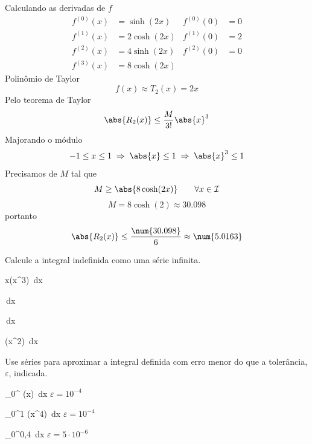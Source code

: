 \begin{exercises}
\begin{exercise}
\begin{answer}
\begin{alphalist}
			\item Calculando as derivadas de $f$
			\begin{align*}
				f^{(0)}(x) & =  \sinh(2x) & f^{(0)}(0) & = 0 \\
				f^{(1)}(x) & = 2\cosh(2x) & f^{(1)}(0) & = 2 \\
				f^{(2)}(x) & = 4\sinh(2x) & f^{(2)}(0) & = 0 \\
				f^{(3)}(x) & = 8\cosh(2x) &
			\end{align*}
			Polinômio de Taylor
			\[ f(x) \approx T_2(x) = 2x \]
			Pelo teorema de Taylor
			\[ \abs{R_2(x)} \leq \frac{M}{3!}\abs{x}^3 \]
			Majorando o módulo
			\[ -1 \leq x \leq 1
			\;\Rightarrow\; \abs{x}   \leq 1
			\;\Rightarrow\; \abs{x}^3 \leq 1
			\]
			Precisamos de $M$ tal que
			\[ M \geq \abs{8\cosh(2x)} \qquad \forall x\in \mathcal{I} \]
			\[ M = 8\cosh(2) \approx 30.098 \]
			portanto
			\[ \abs{R_2(x)} \leq \frac{\num{30.098}}{6} \approx \num{5.0163} \]
		\end{alphalist}
	\end{answer}
\end{exercise}

\begin{exercise}
	Calcule a integral indefinida como uma série infinita.
	\begin{mathlist}
		\item \int x\cos\left(x^3\right) \,dx
		\item \int {}\,dx
		\item \int {}\,dx
		\item \int \arctan(x^2) \,dx
	\end{mathlist}
\end{exercise}

\begin{exercise}
	Use séries para aproximar a integral definida com erro menor do que a
	tolerância, $\varepsilon$, indicada.
	\begin{mathlist}
		\item \int_{0}^{} \arctan(x) \,dx \) \tabto{50mm} \( \varepsilon = 10^{-4} \)
		\item \int_{0}^{1} \sin(x^4) \,dx             \) \tabto{50mm} \( \varepsilon = 10^{-4} \)
		\item \int_{0}^{0,4}  \,dx        \) \tabto{50mm} \( \varepsilon = 5\cdot 10^{-6} \)
	\end{mathlist}
\end{exercise}


\end{exercises}
